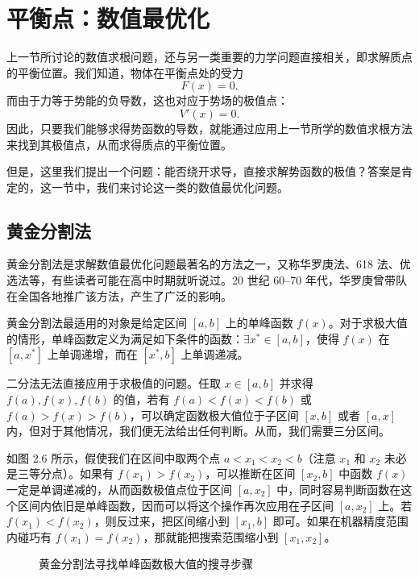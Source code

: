 \section{平衡点：数值最优化}

上一节所讨论的数值求根问题，还与另一类重要的力学问题直接相关，即求解质点的平衡位置。我们知道，物体在平衡点处的受力
\[
F(x)=0.
\]
而由于力等于势能的负导数，这也对应于势场的极值点：
\[
V'(x)=0.
\]
因此，只要我们能够求得势函数的导数，就能通过应用上一节所学的数值求根方法来找到其极值点，从而求得质点的平衡位置。

但是，这里我们提出一个问题：能否绕开求导，直接求解势函数的极值？答案是肯定的，这一节中，我们来讨论这一类的数值最优化问题。

\subsection{黄金分割法}

黄金分割法是求解数值最优化问题最著名的方法之一，又称华罗庚法、618 法、优选法等，有些读者可能在高中时期就听说过。20 世纪 60--70 年代，华罗庚曾带队在全国各地推广该方法，产生了广泛的影响。

黄金分割法最适用的对象是给定区间 $[a,b]$ 上的单峰函数 $f(x)$。对于求极大值的情形，单峰函数定义为满足如下条件的函数：$\exists x^*\in[a,b]$，使得 $f(x)$ 在 $[a,x^*]$ 上单调递增，而在 $[x^*,b]$ 上单调递减。

二分法无法直接应用于求极值的问题。任取 $x\in[a,b]$ 并求得 $f(a),f(x),f(b)$ 的值，若有 $f(a)<f(x)<f(b)$ 或 $f(a)>f(x)>f(b)$，可以确定函数极大值位于子区间 $[x,b]$ 或者 $[a,x]$ 内，但对于其他情况，我们便无法给出任何判断。从而，我们需要三分区间。

如图 2.6 所示，假使我们在区间中取两个点 $a<x_1<x_2<b$（注意 $x_1$ 和 $x_2$ 未必是三等分点）。如果有 $f(x_1)>f(x_2)$，可以推断在区间 $[x_2,b]$ 中函数 $f(x)$ 一定是单调递减的，从而函数极值点位于区间 $[a,x_2]$ 中，同时容易判断函数在这个区间内依旧是单峰函数，因而可以将这个操作再次应用在子区间 $[a,x_2]$ 上。若 $f(x_1)<f(x_2)$，则反过来，把区间缩小到 $[x_1,b]$ 即可。如果在机器精度范围内碰巧有 $f(x_1)=f(x_2)$，那就能把搜索范围缩小到 $[x_1,x_2]$。

\begin{figure}[htbp]
\centering
{}
\caption{黄金分割法寻找单峰函数极大值的搜寻步骤}
\label{fig:golden-search}
\end{figure}

